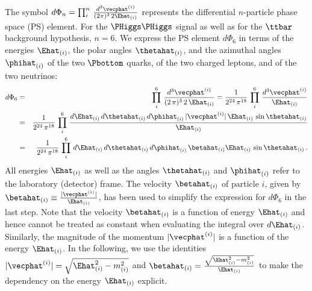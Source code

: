 The symbol $d\Phi_{n} = \prod_{i}^{n} \, \frac{d^{3}\vecphat^{(i)}}{(2\pi)^{3} \, 2 \Ehat_{(i)}}$ 
represents the differential $n$-particle phase space (PS) element.
For the $\PHiggs\PHiggs$ signal 
as well as for the $\ttbar$ background hypothesis, $n=6$.  
We express the PS element $d\Phi_{6}$ in terms of the energies $\Ehat_{(i)}$, the polar angles $\thetahat_{(i)}$, and the azimuthal angles $\phihat_{(i)}$ 
of the two $\Pbottom$ quarks, of the two charged leptons, and of the two neutrinos:
\begin{eqnarray}
d\Phi_{6} 
 & = &\prod_{i}^{6} \, \frac{d^{3}\vecphat^{(i)}}{(2 \, \pi)^{3} \, 2 \, \Ehat_{(i)}} 
  = \frac{1}{2^{24} \, \pi^{18}} \, \prod_{i}^{6} \, 
\frac{d^{3}\vecphat^{(i)}}{\Ehat_{(i)}} \nonumber \\
 & = & \frac{1}{2^{24} \, \pi^{18}} \, \prod_{i}^{6} \, 
\frac{d\Ehat_{(i)} \, d\thetahat_{(i)} \, d\phihat_{(i)} \, |\vecphat^{(i)}| \, \Ehat_{(i)} \, \sin\thetahat_{(i)}}{\Ehat_{(i)}} \nonumber \\
 & = & \frac{1}{2^{24} \, \pi^{18}} \, \prod_{i}^{6} \, 
d\Ehat_{(i)} \, d\thetahat_{(i)} \, d\phihat_{(i)} \, \betahat_{(i)} \Ehat_{(i)} \, \sin\thetahat_{(i)} \, .
\label{eq:PS_inPolarCoordinates}
\end{eqnarray}
All energies $\Ehat_{(i)}$ as well as the angles $\thetahat_{(i)}$ and $\phihat_{(i)}$ refer to the laboratory (detector) frame.
The velocity $\betahat_{(i)}$ of particle $i$,
given by $\betahat_{(i)} \equiv \frac{|\vecphat^{(i)}|}{\Ehat_{(i)}}$,
has been used to simplify the expression for $d\Phi_{6}$ in the last step.
Note that the velocity $\betahat_{(i)}$ is a function of energy $\Ehat_{(i)}$ and hence cannot be treated as constant when evaluating the integral over $d\Ehat_{(i)}$.
Similarly, the magnitude of the momentum $|\vecphat^{(i)}|$ is a function of the energy $\Ehat_{(i)}$.
In the following, we use the identities $|\vecphat^{(i)}| = \sqrt{\Ehat_{(i)}^{2} - m_{(i)}^{2}}$ 
and $\betahat_{(i)} = \frac{\sqrt{\Ehat_{(i)}^{2} - m_{(i)}^{2}}}{\Ehat_{(i)}}$ to make the dependency on the energy $\Ehat_{(i)}$ explicit.

